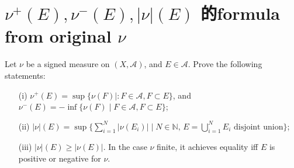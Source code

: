 \documentclass[lang=cn,11pt]{elegantbook}
\begin{document}
 \section{$\nu^+(E), \nu^-(E),|\nu|(E)$ 的formula from original $\nu$}
  Let $\nu$ be a signed measure on $(X,\mathcal{A})$, and $E\in\mathcal{A}$. Prove the following statements:
  \begin{itemize}
  \item[(i)]$\nu^+(E)= \sup\{ \nu(F)\mid: F\in \mathcal{A}, F\subset E\}$, and   $\nu^-(E)= -  \inf\{ \nu(F)\mid  F\in \mathcal{A}, F\subset E\}$; 
  \item[(ii)]   $|\nu|(E)= \sup\{ \sum_{i=1}^N |\nu(E_i)|\mid N\in\mathbb{N}, \, E= \bigcup_{i=1}^N E_i \text{ disjoint union}\}$;
  \item[(iii)]   $|\nu|(E)\ge|\nu(E)|$. In the case $\nu$ finite, it achieves equality iff $E$ is positive or negative for $\nu$.
  \end{itemize}
\end{document}
